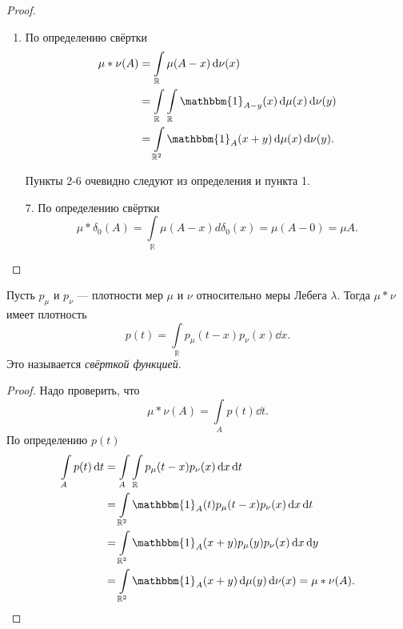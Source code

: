       \begin{proof}
\enewline
         \begin{enumerate}
             \item По определению свёртки
             \begin{align*}
                 \mu * \nu(A) &= \int\limits_\mathbb{R} \mu(A - x) \dd\nu(x) \\&= \int\limits_{\mathbb{R}}\int\limits_\mathbb{R} \mathbbm{1}_{A - y}(x) \dd\mu(x)\dd\nu(y) \\&= \int\limits_{\mathbb{R}^2}\mathbbm{1}_A (x + y) \dd\mu(x)\dd\nu(y).
             \end{align*}
             \item[] Пункты 2-6 очевидно следуют из определения и пункта 1.
             \item[7.] По определению свёртки
             $$\mu*\delta_0 (A) = \int\limits_\mathbb{R} \mu(A - x)d\delta_0(x) =  \mu (A - 0) = \mu A.$$ \qedhere
         \end{enumerate}
                       
\end{proof}

     \begin{theorem}
         Пусть $p_\mu$ и $p_\nu$ --- плотности мер $\mu$ и $\nu$ относительно меры Лебега $\lambda$.
         Тогда $\mu*\nu$ имеет плотность
         $$p(t) = \int\limits_\mathbb{R} p_\mu (t - x) p_\nu (x) \dd x.$$
         Это называется \textit{свёрткой функцией}.
     \end{theorem}

     \begin{proof}
        Надо проверить, что 
        $$\mu*\nu(A) = \int\limits_A p(t)\dd t.$$ 
        По определению $p(t)$
        \begin{align*}
            \int\limits_A p(t)\dd t &= \int\limits_A\int\limits_\mathbb{R} p_\mu(t - x)p_\nu(x)\dd x\dd t \\&= \int\limits_{\mathbb{R}^2}\mathbbm{1}_A(t)p_\mu(t-x)p_\nu(x) \dd x\dd t \\&= \int\limits_{\mathbb{R}^2}\mathbbm{1}_A(x+y)p_\mu(y)p_\nu(x)\dd x\dd y \\&= \int\limits_{\mathbb{R}^2} \mathbbm{1}_A(x+y) \dd\mu(y)\dd\nu(x) = \mu*\nu(A).
        \end{align*}
       
     \end{proof}
